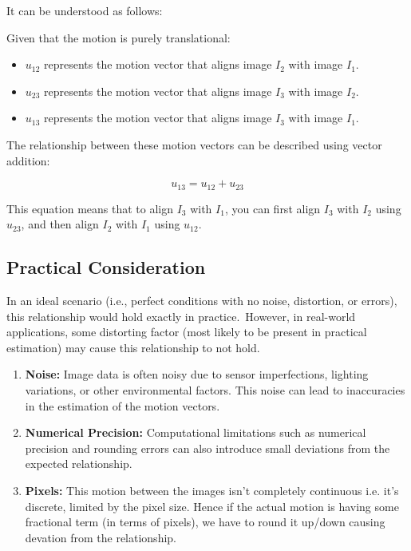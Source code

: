 \documentclass[12pt]{article}
\begin{document}
    \vspace{-5pt}

    It can be understood as follows:

    Given that the motion is purely translational:

    \vspace{-10pt}

    \begin{itemize}[itemsep=-0.25em]
        \item $u_{12}$ represents the motion vector that aligns image $I_2$ with image $I_1$.
        \item $u_{23}$ represents the motion vector that aligns image $I_3$ with image $I_2$.
        \item $u_{13}$ represents the motion vector that aligns image $I_3$ with image $I_1$.
    \end{itemize}

    \vspace{-9pt}

    The relationship between these motion vectors can be described using vector addition:

    \vspace{-10pt}

    \[
    u_{13} = u_{12} + u_{23}
    \]

    This equation means that to align $I_3$ with $I_1$, you can first align $I_3$ with $I_2$ using $u_{23}$, and then align $I_2$ with $I_1$ using $u_{12}$.

    \vspace{-10pt}

    \subsection*{Practical Consideration}

    \vspace{-5pt}

    In an ideal scenario (i.e., perfect conditions with no noise, distortion, or errors), this relationship would hold exactly in practice.\ However, in real-world applications, some distorting factor (most likely to be present in practical estimation) may cause this relationship to not hold.

    \vspace{-10pt}

    \begin{enumerate}[itemsep=-0.25em]
        \item \textbf{Noise:} Image data is often noisy due to sensor imperfections, lighting variations, or other environmental factors. This noise can lead to inaccuracies in the estimation of the motion vectors.
        \item \textbf{Numerical Precision:} Computational limitations such as numerical precision and rounding errors can also introduce small deviations from the expected relationship.
        \item \textbf{Pixels:} This motion between the images isn’t completely continuous i.e. it’s discrete, limited by the pixel size. Hence if the actual motion is having some fractional term (in terms of pixels), we have to round it up/down causing devation from the relationship.
    \end{enumerate}
    \clearpage
\end{document}
